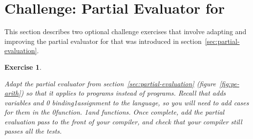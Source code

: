 \documentclass[7x10]{TimesAPriori_MIT}%
\def\racketEd{0}
\def\pythonEd{1}
\def\edition{1}
\newcommand{\racket}[1]{{\if\edition\racketEd{#1}\fi}}
\newcommand{\pythonColor}[0]{}
\newcommand{\python}[1]{{\if\edition\pythonEd\pythonColor #1\fi}}
\newtheorem{exercise}[theorem]{Exercise}
\numberwithin{theorem}{chapter}
\numberwithin{definition}{chapter}
\numberwithin{equation}{chapter}
\begin{document}
\section{Challenge: Partial Evaluator for \LangVar{}}
\label{sec:pe-Lvar}

This section describes two optional challenge exercises that involve
adapting and improving the partial evaluator for \LangInt{} that was
introduced in section~\ref{sec:partial-evaluation}.

\begin{exercise}\label{ex:pe-Lvar}
\normalfont\normalsize
  
Adapt the partial evaluator from section~\ref{sec:partial-evaluation}
(figure~\ref{fig:pe-arith}) so that it applies to \LangVar{} programs
instead of \LangInt{} programs. Recall that \LangVar{} adds variables and
%
\racket{ binding}\python{assignment}
%
to the \LangInt{} language, so you will need to add cases for them in
the 
%
\racket{function.}
%
\python{and  functions.}
%
Once complete, add the partial evaluation pass to the front of your
compiler, and check that your compiler still passes all the
tests.
\end{exercise}
\end{document}
